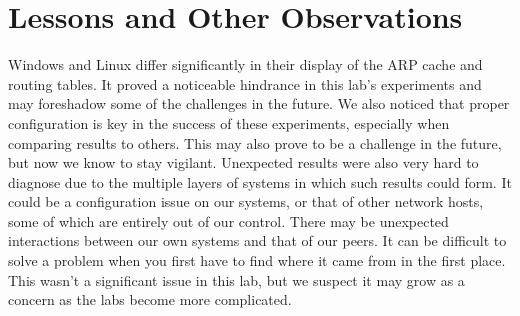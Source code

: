 \documentclass[prb,preprint]{revtex4-1}
\begin{document}
\section{Lessons and Other Observations}
Windows and Linux differ significantly in their display of the ARP cache and routing tables. It proved a noticeable hindrance in this lab's experiments and may foreshadow some of the challenges in the future.
\newline
\linebreak
We also noticed that proper configuration is key in the success of these experiments, especially when comparing results to others. This may also prove to be a challenge in the future, but now we know to stay vigilant.
\newline
\linebreak
Unexpected results were also very hard to diagnose due to the multiple layers of systems in which such results could form. It could be a configuration issue on our systems, or that of other network hosts, some of which are entirely out of our control. There may be unexpected interactions between our own systems and that of our peers. It can be difficult to solve a problem when you first have to find where it came from in the first place. This wasn't a significant issue in this lab, but we suspect it may grow as a concern as the labs become more complicated.
\end{document}
